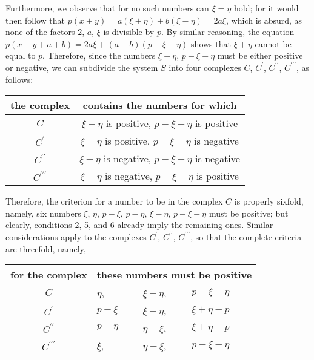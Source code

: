 \documentclass[twoside,12pt]{memoir}
\begin{document}
Furthermore, we observe that for no such numbers can \(\xi=\eta\) hold; for it would then follow that \(p(x+y)=a(\xi+\eta)+b(\xi-\eta)=2a\xi\), which is absurd, as none of the factors \(2\), \(a\), \(\xi\) is divisible by \(p\). By similar reasoning, the equation \(p(x-y+a+b)=2a\xi+(a+b)(p-\xi-\eta)\) shows that \(\xi+\eta\) cannot be equal to \(p\). Therefore, since the numbers \(\xi-\eta\), \(p-\xi-\eta\) must be either positive or negative, we can subdivide the system \(S\) into four complexes \(C\), \(C^{\prime}\), \(C^{\prime\prime}\), \(C^{\prime\prime\prime}\), as follows:
\begin{center}
\begin{tabular}{c|c}
the complex & contains the numbers for which \\
\hline
\(C\) & \(\xi-\eta\) is positive, \(p-\xi-\eta\) is positive \\
\(C^{\prime}\) & \(\xi-\eta\) is positive, \(p-\xi-\eta\) is negative \\
\(C^{\prime \prime}\) & \(\xi-\eta\) is negative, \(p-\xi-\eta\) is negative \\
\(C^{\prime \prime \prime}\) & \(\xi-\eta\) is negative, \(p-\xi-\eta\) is positive \\
\end{tabular}
\end{center}
Therefore, the criterion for a number to be in the complex \(C\) is properly sixfold, namely, six numbers \(\xi\), \(\eta\), \(p-\xi\), \(p-\eta\), \(\xi-\eta\), \(p-\xi-\eta\) must be positive; but clearly, conditions 2, 5, and 6 already imply the remaining ones. Similar considerations apply to the complexes \(C^{\prime}\), \(C^{\prime\prime}\), \(C^{\prime\prime\prime}\), so that the complete criteria are threefold, namely,
\begin{center}
\begin{tabular}{c|lll}
for the complex & \multicolumn{3}{c}{these numbers must be positive}   \\
\hline
\(C\) & \(\eta\), & \(\xi-\eta\), & \(p-\xi-\eta\) \\
\(C^{\prime}\) & \(p-\xi\) & \(\xi-\eta\), & \(\xi+\eta-p\)   \\
\(C^{\prime \prime}\) & \(p-\eta\)& \(\eta-\xi\), & \(\xi+\eta-p\)   \\
\(C^{\prime \prime \prime}\) & \(\xi\), & \(\eta-\xi\), & \(p-\xi-\eta\) \\
\end{tabular}
\end{center}
%
\end{document}

